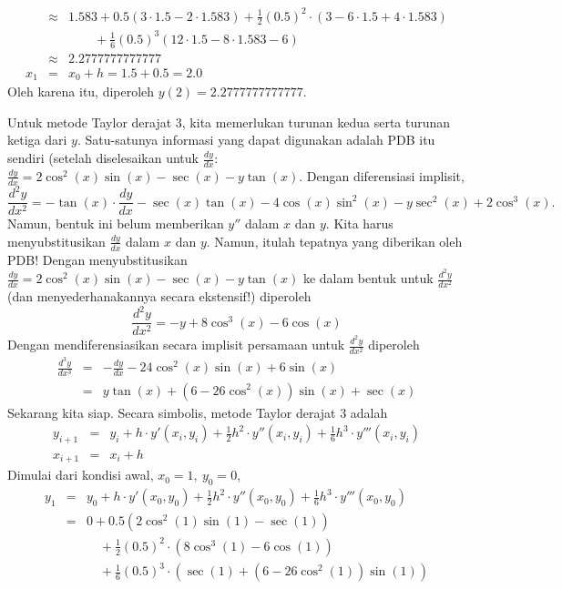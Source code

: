 \begin{description}
\begin{eqnarray*}
 & \approx & 1.583+0.5(3\cdot1.5-2\cdot1.583)+\frac{1}{2}(0.5)^{2}\cdot(3-6\cdot1.5+4\cdot1.583)\\
 &  & \qquad+\frac{1}{6}(0.5)^{3}(12\cdot1.5-8\cdot1.583-6)\\
 & \approx & 2.2777777777777\\
x_{1} & = & x_{0}+h=1.5+0.5=2.0
\end{eqnarray*}
Oleh karena itu, diperoleh $y(2)=2.2777777777777$.
\item [{\ref{exc:ode-taylor-10}d:}] Untuk metode Taylor derajat 3, kita
memerlukan turunan kedua serta turunan ketiga dari $y$. Satu-satunya
informasi yang dapat digunakan adalah PDB itu sendiri (setelah diselesaikan
untuk $\frac{dy}{dx}$: $\frac{dy}{dx}=2\cos^{2}(x)\sin(x)-\sec(x)-y\tan(x)$.
Dengan diferensiasi implisit,
\[
\frac{d^{2}y}{dx^{2}}=-\tan(x)\cdot\frac{dy}{dx}-\sec(x)\tan(x)-4\cos(x)\sin^{2}(x)-y\sec^{2}(x)+2\cos^{3}(x).
\]
Namun, bentuk ini belum memberikan $y''$ dalam $x$ dan $y$. Kita
harus menyubstitusikan $\frac{dy}{dx}$ dalam $x$ dan $y$. Namun,
itulah tepatnya yang diberikan oleh PDB! Dengan menyubstitusikan $\frac{dy}{dx}=2\cos^{2}(x)\sin(x)-\sec(x)-y\tan(x)$
ke dalam bentuk untuk $\frac{d^{2}y}{dx^{2}}$ (dan menyederhanakannya
secara ekstensif!) diperoleh
\[
\frac{d^{2}y}{dx^{2}}=-y+8\cos^{3}(x)-6\cos(x)
\]
Dengan mendiferensiasikan secara implisit persamaan untuk $\frac{d^{2}y}{dx^{2}}$
diperoleh
\begin{eqnarray*}
\frac{d^{3}y}{dx^{3}} & = & -\frac{dy}{dx}-24\cos^{2}(x)\sin(x)+6\sin(x)\\
 & = & y\tan(x)+(6-26\cos^{2}(x))\sin(x)+\sec(x)
\end{eqnarray*}
Sekarang kita siap. Secara simbolis, metode Taylor derajat 3 adalah
\begin{eqnarray*}
y_{i+1} & = & y_{i}+h\cdot y'(x_{i},y_{i})+\frac{1}{2}h^{2}\cdot y''(x_{i},y_{i})+\frac{1}{6}h^{3}\cdot y'''(x_{i},y_{i})\\
x_{i+1} & = & x_{i}+h
\end{eqnarray*}
Dimulai dari kondisi awal, $x_{0}=1,\ y_{0}=0$,
\begin{eqnarray*}
y_{1} & = & y_{0}+h\cdot y'(x_{0},y_{0})+\frac{1}{2}h^{2}\cdot y''(x_{0},y_{0})+\frac{1}{6}h^{3}\cdot y'''(x_{0},y_{0})\\
 & = & 0+0.5(2\cos^{2}(1)\sin(1)-\sec(1))\\
 &  & \quad+\frac{1}{2}(0.5)^{2}\cdot(8\cos^{3}(1)-6\cos(1))\\
 &  & \quad+\frac{1}{6}(0.5)^{3}\cdot(\sec(1)+(6-26\cos^{2}(1))\sin(1))\\

\end{eqnarray*}
\end{description}
